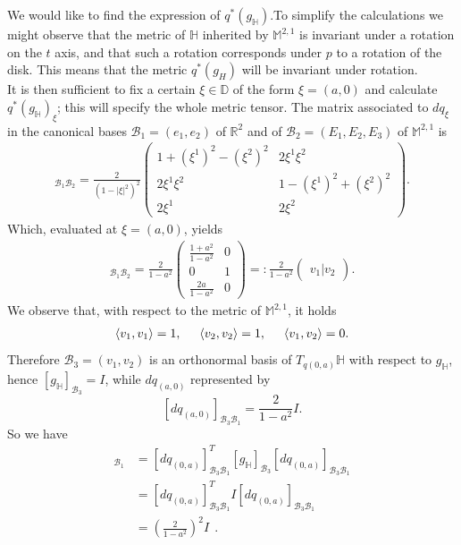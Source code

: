\documentclass[a4paper,11pt,openright,twoside]{book}
\newcommand{\R}{\mathbb{R}}
\newcommand{\M}{\mathbb{M}^{2,1}}
\newcommand{\1}{\mathds{1}}
\theoremstyle{plain}
\theoremstyle{definition}
\theoremstyle{remark}
\begin{document}
We would like to find the expression of  $q^*(g_\mathbb{H})$.To simplify the calculations we might observe that the metric of $\mathbb{H}$ inherited by $\M$ is invariant under a rotation on the $t$ axis, and that such a rotation corresponds under $p$ to a rotation of the disk. This means that the metric $q^*(g_{H})$ will be invariant under rotation.\\
It is then sufficient to fix a certain $\xi\in \mathbb{D}$ of the form $\xi = (a,0) $ and calculate $q^*(g_\mathbb{H})_\xi$; this will specify the whole metric tensor. The matrix associated to $dq_\xi$ in the canonical bases $\mathscr{B}_1	= (e_1,e_2)$ of $\R^2$ and of $\mathscr{B}_{2}=(E_1,E_2,E_3)$ of $\M$ is
\begin{align*}
	[dq_\xi]_{\mathscr{B}_1 \mathscr{B}_2}
	=
	\frac{2}{(1-|\xi|^2)^2}
	\begin{pmatrix}
		1+(\xi^1)^2-(\xi^2)^2 & 2\xi^1\xi^2 \\
		2\xi^1\xi^2 & 1-(\xi^1)^2+(\xi^2)^2 \\
		2\xi^1 & 2\xi^2
	\end{pmatrix}.
\end{align*}
Which, evaluated at $\xi=(a,0)$, yields
\begin{align*}
	[dq_{(a,0)}]_{\mathscr{B}_1 \mathscr{B}_2}
	=
	\frac{2}{1-a^2}
	\begin{pmatrix}
		\frac{1+a^2}{1-a^2} & 0 \\
		0 & 1 \\
		\frac{2a}{1-a^2} & 0
	\end{pmatrix} =: 
	\frac{2}{1-a^2}\begin{pmatrix} v_1|v_2 \end{pmatrix} .
\end{align*}
We observe that, with respect to the metric of $\M$, it holds
\begin{align*}
	\langle v_1,v_1\rangle = 1,
	\hspace{5mm}
	\langle v_2,v_2\rangle = 1,
	\hspace{5mm}
	\langle v_1,v_2\rangle = 0.
\end{align*}
Therefore $\mathscr{B}_3 = (v_1,v_2)$ is an orthonormal basis of $T_{q(0,a)}\mathbb{H}$ with respect to $g_{\mathbb{H}}$, hence $[g_{\mathbb{H}}]_{\mathscr{B}_3 }= I $, while $dq_{(a,0)}$ represented by
\[[dq_{(a,0)}]_{\mathscr{B}_3\mathscr{B}_1} = \frac{2}{1-a^2}I.\] 
So we have
\begin{align*}
	[q^*(g_{\mathbb H})_{(0,a)}]_{\mathscr{B}_1}
	&=
	[dq_{(0,a)}]_{\mathscr{B}_3 \mathscr{B}_1}^T[g_{\mathbb H}]_{\mathscr{B}_3}[dq_{(0,a)}]_{\mathscr{B}_3 \mathscr{B}_1}\\
	&=
	[dq_{(0,a)}]_{\mathscr{B}_3 \mathscr{B}_1}^TI[dq_{(0,a)}]_{\mathscr{B}_3 \mathscr{B}_1}\\
	&=
	\left(\frac{2}{1-a^2}\right)^2 I
\ \ .
\end{align*}
\end{document}
